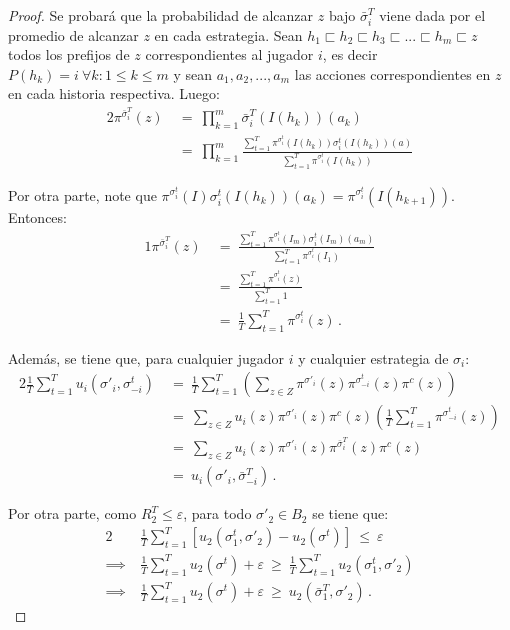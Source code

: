 \begin{proof}
Se probará que la probabilidad de alcanzar $z$ bajo $\bar{\sigma}_i^T$ viene dada por el promedio de alcanzar $z$ en cada estrategia. Sean $h_1 \sqsubset h_2 \sqsubset h_3 \sqsubset ... \sqsubset h_m \sqsubset z$ todos los prefijos de $z$ correspondientes al jugador $i$, es decir $P(h_k) = i\ \forall k : 1 \leq k \leq m$ y sean $a_1, a_2, ..., a_m$ las acciones correspondientes en $z$ en cada historia respectiva. Luego:
\begin{alignat}{2}
\pi^{\bar{\sigma}_i^T}(z)\ &=\ \prod_{k = 1}^m \bar{\sigma}_i^T(I(h_k))(a_k) \\	&=\ \prod_{k = 1}^m \frac{\sum_{t = 1}^{T}  \pi^{\sigma_i^t}(I(h_k))\sigma^t_i(I(h_k))(a)}{\sum_{t = 1}^T \pi^{\sigma_i^t}(I(h_k))}
\end{alignat}

Por otra parte, note que $\pi^{\sigma_i^t}(I)\sigma_i^t(I(h_k))(a_k) = \pi^{\sigma_i^t}(I(h_{k+1}))$. Entonces:
\begin{alignat}{1}
	\pi^{\bar{\sigma}_i^T}(z)\ &=\ \frac{\sum_{t = 1}^T\pi^{\sigma_i^t}(I_m) \sigma_i^t(I_m)(a_m)}{\sum_{t = 1}^T \pi^{\sigma_i^t}(I_1)} \\
	&=\ \frac{\sum_{t = 1}^T \pi^{\sigma_i^t}(z)}{\sum_{t = 1}^T 1} \\
	&=\ \frac{1}{T} \sum_{t = 1}^T \pi^{\sigma_i^t}(z) \,.
\end{alignat}

Además, se tiene que, para cualquier jugador $i$ y cualquier estrategia de $\sigma_i$:
\begin{alignat}{2}
\frac{1}{T} \sum_{t = 1}^T u_i(\sigma'_i, \sigma_{-i}^t)\ &=\ \frac{1}{T} \sum_{t = 1}^T \left( \sum_{z \in Z} \pi^{\sigma'_i}(z) \pi^{\sigma_{-i}^t}(z) \pi^c(z) \right) \\
	&=\ \sum_{z \in Z} u_i(z) \pi^{\sigma'_i}(z) \pi^c(z) \left( \frac{1}{T} \sum_{t = 1}^T \pi^{\sigma_{-i}^t}(z) \right) \\
	&=\ \sum_{z \in Z} u_i(z) \pi^{\sigma'_i}(z) \pi^{\bar{\sigma}_i^T}(z) \pi^c(z) \\
	&=\ u_i(\sigma'_i, \bar{\sigma}_{-i}^T) \,.
\end{alignat}

Por otra parte, como $R_2^T \leq \varepsilon$, para todo $\sigma'_2 \in B_2$ se tiene que:
\begin{alignat}{2}
	& \frac{1}{T} \sum_{t = 1}^T[u_2(\sigma_1^t, \sigma'_2) - u_2(\sigma^t)]\  \leq\  \varepsilon\\
	\implies\ & \frac{1}{T} \sum_{t = 1}^T u_2(\sigma^t) + \varepsilon\  \geq\  \frac{1}{T} \sum_{t = 1}^T u_2(\sigma_1^t, \sigma'_2) \\
	\implies\ & \frac{1}{T} \sum_{t = 1}^T u_2(\sigma^t) + \varepsilon\ \geq\ u_2(\bar{\sigma}_1^T, \sigma'_2) \,.
\end{alignat}


\end{proof}
